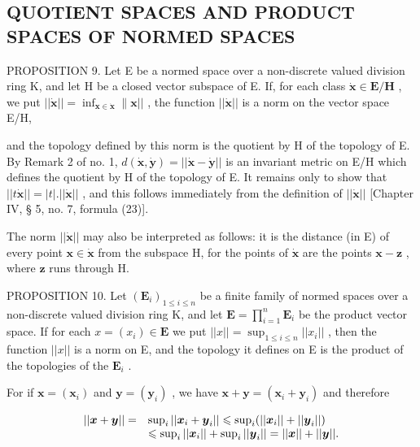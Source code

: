 \subsection{QUOTIENT SPACES AND PRODUCT SPACES OF NORMED SPACES}

PROPOSITION 9. Let E be a normed space over a non-discrete valued division ring K, and let H be a closed vector subspace of E. If, for each class \(\dot{\mathbf{x}}\in\mathbf{E}/\mathbf{H}\) , we put \(||\dot{\mathbf{x}}||=\inf_{\mathbf{x}\in\dot{\mathbf{x}}}\|\mathbf{x}||\) , the function \(||\dot{\mathbf{x}}||\) is a norm on the vector space E/H,

and the topology defined by this norm is the quotient by H of the topology of E. By Remark 2 of no. 1, \(d(\dot{\boldsymbol{x}}, \dot{\boldsymbol{y}}) = ||\dot{\boldsymbol{x}} - \dot{\boldsymbol{y}}||\) is an invariant metric on E/H which defines the quotient by H of the topology of E. It remains only to show that \(||t\dot{\boldsymbol{x}}|| = |t|.||\dot{\boldsymbol{x}}||\) , and this follows immediately from the definition of \(||\dot{\boldsymbol{x}}||\) {[}Chapter IV, § 5, no. 7, formula (23){]}.

The norm \(||\dot{\pmb{x}}||\) may also be interpreted as follows: it is the distance (in E) of every point \(\pmb{x} \in \dot{\pmb{x}}\) from the subspace H, for the points of \(\dot{\pmb{x}}\) are the points \(\pmb{x} - \pmb{z}\) , where \(\pmb{z}\) runs through H.

PROPOSITION 10. Let \((\mathbf{E}_i)_{1 \leqslant i \leqslant n}\) be a finite family of normed spaces over a non-discrete valued division ring K, and let \(\mathbf{E} = \prod_{i=1}^{n} \mathbf{E}_i\) be the product vector space. If for each \(x = (x_i) \in \mathbf{E}\) we put \(||x|| = \sup_{1 \leqslant i \leqslant n} ||x_i||\) , then the function \(||x||\) is a norm on E, and the topology it defines on E is the product of the topologies of the \(\mathbf{E}_i\) .

For if \(\pmb{x} = (\pmb{x}_i)\) and \(\pmb{y} = (\pmb{y}_i)\) , we have \(\pmb{x} + \pmb{y} = (\pmb{x}_i + \pmb{y}_i)\) and therefore

\[
\begin{array}{r l} | | \boldsymbol {x} + \boldsymbol {y} | | = & \sup _ {i} | | \boldsymbol {x} _ {i} + \boldsymbol {y} _ {i} | | \leqslant \sup _ {i} (| | \boldsymbol {x} _ {i} | | + | | \boldsymbol {y} _ {i} | |) \\ & \leqslant \sup _ {i} | | \boldsymbol {x} _ {i} | | + \sup _ {i} | | \boldsymbol {y} _ {i} | | = | | \boldsymbol {x} | | + | | \boldsymbol {y} | |. \end{array}
\]

